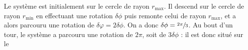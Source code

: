 \documentclass[a4paper,french,bookmarks]{article}
\begin{document}
\begin{enumerate}
{            Le système est initialement sur le cercle de rayon $r_\text{max}$. Il descend sur le cercle de rayon $r_\text{min}$ en effectuant une rotation $\delta \phi$ puis remonte celui de rayon $r_\text{max}$, et a alors parcouru une rotation de $\delta \varphi = 2\delta \phi$. On a donc $\delta \phi = \sfrac{2\pi}{3}$. Au bout d'un tour, le système a parcouru une rotation de $2\pi$, soit de $3\delta \phi$ : il est donc situé sur le 
        }
        \nobefore\yesafter
        \yesbefore
    \end{enumerate}
    
\end{document}
